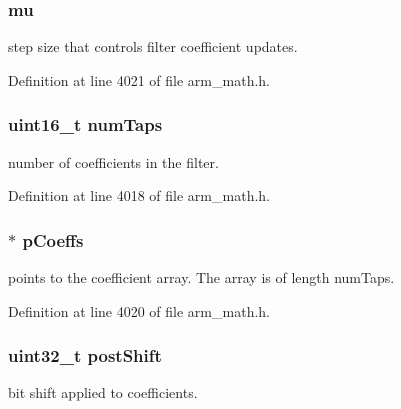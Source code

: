 \subsubsection[{\texorpdfstring{mu}{mu}}]{ mu}\hypertarget{structarm__lms__instance__q15_aab4745770bd667de040227eec1b5ff8d}{}\label{structarm__lms__instance__q15_aab4745770bd667de040227eec1b5ff8d}
step size that controls filter coefficient updates. 

Definition at line 4021 of file arm\+\_\+math.\+h.

\subsubsection[{\texorpdfstring{num\+Taps}{numTaps}}]{\setlength{\rightskip}{0pt plus 5cm}uint16\+\_\+t num\+Taps}\hypertarget{structarm__lms__instance__q15_a751941891e47f522a7f5375fe8990aac}{}\label{structarm__lms__instance__q15_a751941891e47f522a7f5375fe8990aac}
number of coefficients in the filter. 

Definition at line 4018 of file arm\+\_\+math.\+h.

\subsubsection[{\texorpdfstring{p\+Coeffs}{pCoeffs}}]{$\ast$ p\+Coeffs}\hypertarget{structarm__lms__instance__q15_a7ca181a37f714d174445f486bebce26f}{}\label{structarm__lms__instance__q15_a7ca181a37f714d174445f486bebce26f}
points to the coefficient array. The array is of length num\+Taps. 

Definition at line 4020 of file arm\+\_\+math.\+h.

\subsubsection[{\texorpdfstring{post\+Shift}{postShift}}]{\setlength{\rightskip}{0pt plus 5cm}uint32\+\_\+t post\+Shift}\hypertarget{structarm__lms__instance__q15_aa2cacddfc5e1d86905d7d31a18b1979b}{}\label{structarm__lms__instance__q15_aa2cacddfc5e1d86905d7d31a18b1979b}
bit shift applied to coefficients. 

